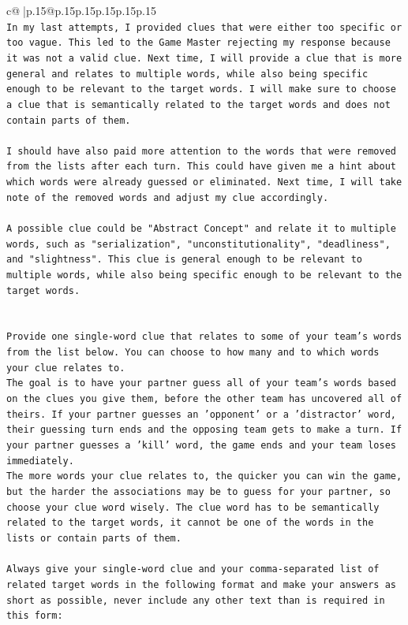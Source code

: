 \documentclass{article}
\begin{document}
{\begin{supertabular}{c@{$\;$}|p{.15\linewidth}@{}p{.15\linewidth}p{.15\linewidth}p{.15\linewidth}p{.15\linewidth}p{.15\linewidth}}
{{{\\ 
\texttt{In my last attempts, I provided clues that were either too specific or too vague. This led to the Game Master rejecting my response because it was not a valid clue. Next time, I will provide a clue that is more general and relates to multiple words, while also being specific enough to be relevant to the target words. I will make sure to choose a clue that is semantically related to the target words and does not contain parts of them.} \\
\\ 
\texttt{I should have also paid more attention to the words that were removed from the lists after each turn. This could have given me a hint about which words were already guessed or eliminated. Next time, I will take note of the removed words and adjust my clue accordingly.} \\
\\ 
\texttt{A possible clue could be "Abstract Concept" and relate it to multiple words, such as "serialization", "unconstitutionality", "deadliness", and "slightness". This clue is general enough to be relevant to multiple words, while also being specific enough to be relevant to the target words.} \\
\\ 
\\ 
\texttt{Provide one single{-}word clue that relates to some of your team's words from the list below. You can choose to how many and to which words your clue relates to.} \\
\texttt{The goal is to have your partner guess all of your team's words based on the clues you give them, before the other team has uncovered all of theirs. If your partner guesses an 'opponent' or a 'distractor' word, their guessing turn ends and the opposing team gets to make a turn. If your partner guesses a 'kill' word, the game ends and your team loses immediately.} \\
\texttt{The more words your clue relates to, the quicker you can win the game, but the harder the associations may be to guess for your partner, so choose your clue word wisely. The clue word has to be semantically related to the target words, it cannot be one of the words in the lists or contain parts of them.} \\
\\ 
\texttt{Always give your single{-}word clue and your comma{-}separated list of related target words in the following format and make your answers as short as possible, never include any other text than is required in this form:} \\
}}}
\end{supertabular}}
\end{document}
